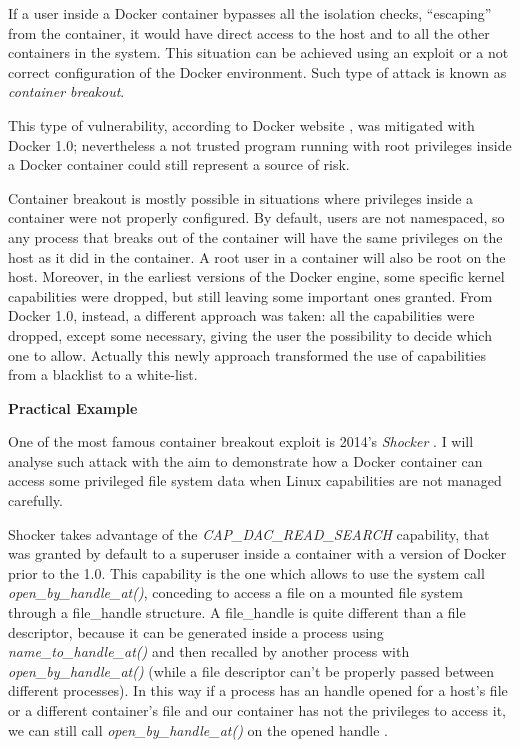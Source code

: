 \documentclass[a4paper,12pt]{article}
\begin{document}
If a user inside a Docker container bypasses all the isolation checks,
``escaping'' from the container, it would have direct access to the host and to
all the other containers in the system. This situation can be achieved using an
exploit or a not correct configuration of the Docker environment. Such type of
attack is known as \textit{container breakout}.\par This type of vulnerability,
according to Docker website \cite{docker_blog_about_container_breakout}, was
mitigated with Docker 1.0; nevertheless a not trusted program running with root
privileges inside a Docker container could still represent a source of risk.
\par Container breakout is mostly possible in situations where privileges inside
a container were not properly configured. By default, users are not namespaced,
so any process that breaks out of the container will have the same privileges on
the host as it did in the container. A root user in a container will also be
root on the host. Moreover, in the earliest versions of the Docker engine, some
specific kernel capabilities were dropped, but still leaving some important ones
granted. From Docker 1.0, instead, a different approach was taken: all the
capabilities were dropped, except some necessary, giving the user the
possibility to decide which one to allow. Actually this newly approach
transformed the use of capabilities from a blacklist to a white-list.

\bigbreak\textbf{Practical Example}\bigbreak 

One of the most famous container breakout exploit is 2014's \textit{Shocker}
\cite{shocker}. I will analyse such attack with the aim to demonstrate how a
Docker container can access some privileged file system data when Linux
capabilities are not managed carefully.\par Shocker takes advantage of the
\textit{CAP\_DAC\_READ\_SEARCH} capability, that was granted by default to a
superuser inside a container with a version of Docker prior to the 1.0. This
capability is the one which allows to use the system call
\textit{open\_by\_handle\_at()}, conceding to access a file on a mounted
file system through a file\_handle structure. A file\_handle is quite different
than a file descriptor, because it can be generated inside a process using
\textit{name\_to\_handle\_at()} and then recalled by another process with
\textit{open\_by\_handle\_at()} (while a file descriptor can't be properly
passed between different processes). In this way if a process has an handle
opened for a host's file or a different container's file and our container has
not the privileges to access it, we can still call
\textit{open\_by\_handle\_at()} on the opened handle
\cite{shocker_how_it_works}.
\end{document}
